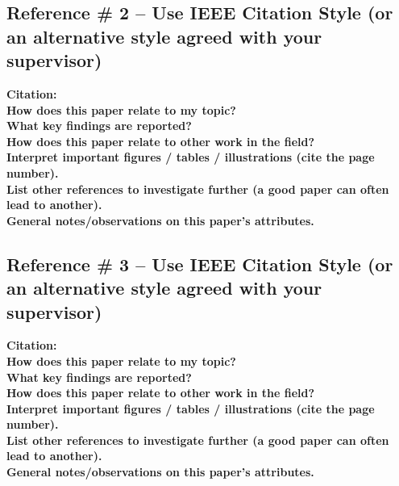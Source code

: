 \documentclass[12pt, a4paper]{article}
\begin{document}
\subsection*{Reference \# 2 -- Use IEEE Citation Style (or an alternative style agreed with your supervisor)}
\textbf{Citation:} \vspace{1cm} \\
\textbf{How does this paper relate to my topic?} \vspace{1.5cm} \\
\textbf{What key findings are reported?} \vspace{1.5cm} \\
\textbf{How does this paper relate to other work in the field?} \vspace{1.5cm} \\
\textbf{Interpret important figures / tables / illustrations (cite the page number).} \vspace{1.5cm} \\
\textbf{List other references to investigate further (a good paper can often lead to another).} \vspace{1.5cm} \\
\textbf{General notes/observations on this paper’s attributes.} \vspace{1.5cm}

\subsection*{Reference \# 3 -- Use IEEE Citation Style (or an alternative style agreed with your supervisor)}
\textbf{Citation:} \vspace{1cm} \\
\textbf{How does this paper relate to my topic?} \vspace{1.5cm} \\
\textbf{What key findings are reported?} \vspace{1.5cm} \\
\textbf{How does this paper relate to other work in the field?} \vspace{1.5cm} \\
\textbf{Interpret important figures / tables / illustrations (cite the page number).} \vspace{1.5cm} \\
\textbf{List other references to investigate further (a good paper can often lead to another).} \vspace{1.5cm} \\
\textbf{General notes/observations on this paper’s attributes.} \vspace{1.5cm}
\end{document}
